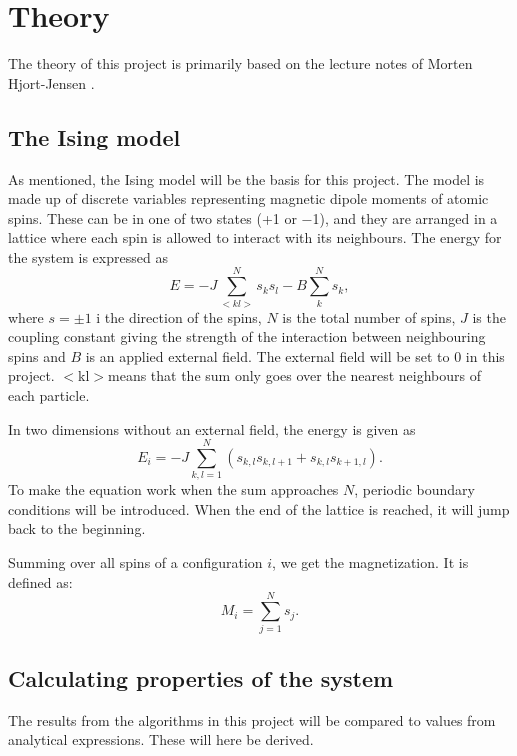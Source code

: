 \documentclass[10pt,a4paper,titlepage]{article}
\begin{document}
\section{Theory}
The theory of this project is primarily  based on the lecture notes of Morten Hjort-Jensen \cite{Bok}.

\subsection{The Ising model}
As mentioned, the Ising model will be the basis for this project. 
The model is made up of discrete variables representing magnetic dipole moments of atomic spins. These can be in one of two states (+1 or −1), and they are arranged in a lattice where each spin is allowed to interact with its neighbours. 
	The energy for the system is expressed as
\begin{equation}
E = -J\sum_{<kl>}^{N}s_{k}s_{l}-B\sum_{k}^{N}s_{k},
\end{equation}
where $s = \pm1$ i the direction of the spins, $N$ is the total number of spins, $J$ is the coupling constant giving the strength of the interaction between neighbouring spins and $B$ is an applied external field. The external field will be set to 0 in this project. $<$kl$>$means that the sum only goes over the nearest neighbours of each particle. 

In two dimensions without an external field, the energy is given as
\begin{equation}
\label{eq:L_2_E}
E_i = -J\sum_{k,l=1}^{N}(s_{k,l}s_{k,l+1}+s_{k,l}s_{k+1,l}).
\end{equation}
To make the equation work when the sum approaches $N$, periodic boundary conditions will be introduced. When the end of the lattice is reached, it will jump back to the beginning. 

Summing over all spins of a configuration $i$, we get the magnetization. It is defined as:
\begin{equation}
M_i=\sum_{j=1}^{N}s_{j}.
\end{equation}

\subsection{Calculating properties of the system}
The results from the algorithms in this project will be compared to values from analytical expressions. These will here be derived. 
\end{document}
